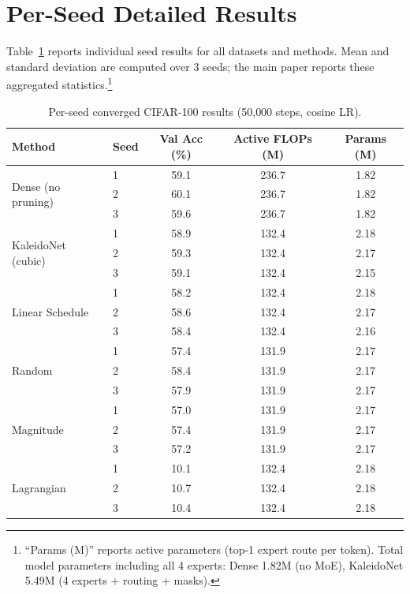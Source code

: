 \appendix
\section{Per-Seed Detailed Results}
\label{sec:appendix_seeds}

Table~\ref{tab:per_seed} reports individual seed results for all datasets and methods. Mean and standard deviation are computed over 3 seeds; the main paper reports these aggregated statistics.\footnote{``Params (M)'' reports active parameters (top-1 expert route per token). Total model parameters including all 4 experts: Dense 1.82M (no MoE), KaleidoNet 5.49M (4 experts + routing + masks).}

\begin{table}[h]
\centering
\caption{Per-seed converged CIFAR-100 results (50{,}000 steps, cosine LR).}
\label{tab:per_seed}
\small
\begin{tabular}{llccc}
\toprule
\textbf{Method} & \textbf{Seed} & \textbf{Val Acc (\%)} & \textbf{Active FLOPs (M)} & \textbf{Params (M)} \\
\midrule
\multirow{3}{*}{Dense (no pruning)} & 1 & 59.1 & 236.7 & 1.82 \\
& 2 & 60.1 & 236.7 & 1.82 \\
& 3 & 59.6 & 236.7 & 1.82 \\
\midrule
\multirow{3}{*}{KaleidoNet (cubic)} & 1 & 58.9 & 132.4 & 2.18 \\
& 2 & 59.3 & 132.4 & 2.17 \\
& 3 & 59.1 & 132.4 & 2.15 \\
\midrule
\multirow{3}{*}{Linear Schedule} & 1 & 58.2 & 132.4 & 2.18 \\
& 2 & 58.6 & 132.4 & 2.17 \\
& 3 & 58.4 & 132.4 & 2.16 \\
\midrule
\multirow{3}{*}{Random} & 1 & 57.4 & 131.9 & 2.17 \\
& 2 & 58.4 & 131.9 & 2.17 \\
& 3 & 57.9 & 131.9 & 2.17 \\
\midrule
\multirow{3}{*}{Magnitude} & 1 & 57.0 & 131.9 & 2.17 \\
& 2 & 57.4 & 131.9 & 2.17 \\
& 3 & 57.2 & 131.9 & 2.17 \\
\midrule
\multirow{3}{*}{Lagrangian} & 1 & 10.1 & 132.4 & 2.18 \\
& 2 & 10.7 & 132.4 & 2.18 \\
& 3 & 10.4 & 132.4 & 2.18 \\
\bottomrule
\end{tabular}
\end{table}

